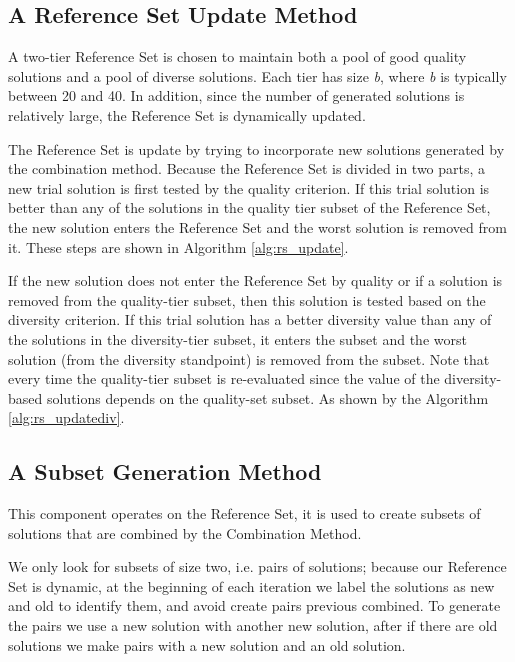\subsection{A Reference Set Update Method}
A two-tier Reference Set
is chosen to maintain both
a pool of good quality solutions
and a pool of diverse solutions.
Each tier has size \textit{b},
where \textit{b}
is typically between 20 and 40.
In addition,
since the number of generated solutions
is relatively large,
the Reference Set is dynamically updated.

The Reference Set is update
by trying to incorporate new solutions
generated by the combination method.
Because the Reference Set is divided
in two parts,
a new trial solution
is first tested by the quality criterion.
If this trial solution
is better
than any of the solutions
in the quality tier subset
of the Reference Set,
the new solution enters the Reference Set
and the worst solution
is removed from it.
These steps are shown in Algorithm \ref{alg:rs_update}.


If the new solution
does not enter the Reference Set by quality
or if a solution is removed
from the quality-tier subset,
then this solution is tested
based on the diversity criterion.
If this trial solution
has a better diversity value than any of the solutions
in the diversity-tier subset,
it enters the subset and the worst solution
(from the diversity standpoint)
is removed from the subset.
Note that every time
the quality-tier subset is re-evaluated
since the value of the diversity-based solutions
depends on the quality-set subset.
As shown by the Algorithm \ref{alg:rs_updatediv}.


\subsection{A Subset Generation Method}
This component operates on the Reference Set,
it is used to create subsets
of solutions that are combined
by the Combination Method.

We only look for subsets of size two,
i.e. pairs of solutions;
because our Reference Set is dynamic,
at the beginning of each iteration
we label the solutions as new and old
to identify them,
and avoid create pairs previous combined.
To generate the pairs
we use
a new solution with another new solution,
after
if there are old solutions
we make pairs
with a new solution
and an old solution.

